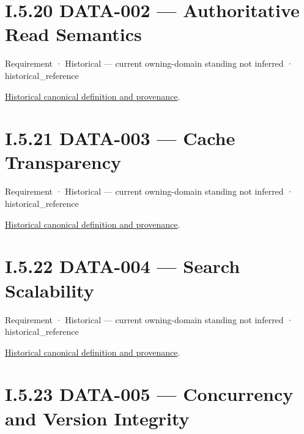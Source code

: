\section*{I.5.20 DATA-002 — Authoritative Read Semantics}
\label{navigation:I.5.20}

\label{element:bc55838493c24617823410798c8d7598}
{\small Requirement · Historical — current owning-domain standing not inferred · historical\_reference}\par
\href{../../../../continuum/motivation/requirement/bc55838493c24617823410798c8d7598.md}{Historical canonical definition and provenance}.\par
\section*{I.5.21 DATA-003 — Cache Transparency}
\label{navigation:I.5.21}

\label{element:ff04c3dab8a04359b9c4d62939839be7}
{\small Requirement · Historical — current owning-domain standing not inferred · historical\_reference}\par
\href{../../../../continuum/motivation/requirement/ff04c3dab8a04359b9c4d62939839be7.md}{Historical canonical definition and provenance}.\par
\section*{I.5.22 DATA-004 — Search Scalability}
\label{navigation:I.5.22}

\label{element:f27e74b6cb13454aa4339932436971e3}
{\small Requirement · Historical — current owning-domain standing not inferred · historical\_reference}\par
\href{../../../../continuum/motivation/requirement/f27e74b6cb13454aa4339932436971e3.md}{Historical canonical definition and provenance}.\par
\section*{I.5.23 DATA-005 — Concurrency and Version Integrity}
\label{navigation:I.5.23}

